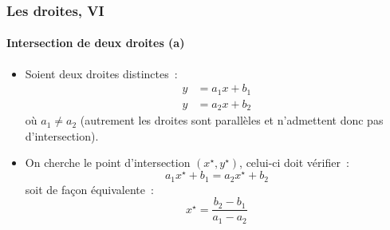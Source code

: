 \documentclass[10pt,notheorems]{beamer}
\theoremstyle{plain}
\theoremstyle{definition} %
\begin{document}
\begin{frame}
  \frametitle{Les droites, VI}
  \framesubtitle{Intersection de deux droites (a)}
  \hypertarget{slide_droites_6_1}{}

  \bigskip

  \begin{itemize}

  \item Soient deux droites distinctes~:
    \begin{eqnarray*}
      y &= a_1 x + b_1\\
      y &= a_2 x + b_2
    \end{eqnarray*}
    où $a_1\neq a_2$ (autrement les droites sont parallèles et n'admettent donc pas d'intersection).\newline

  \item On cherche le point d'intersection $(x^{\star},y^{\star})$, celui-ci doit vérifier~:
    \[
      a_1 x^{\star} + b_1 = a_2 x^{\star} + b_2
    \]
    soit de façon équivalente~:
    \[
      x^{\star} = \frac{b_2-b_1}{a_1-a_2}
    \]

  \end{itemize}

\end{frame}
\end{document}
